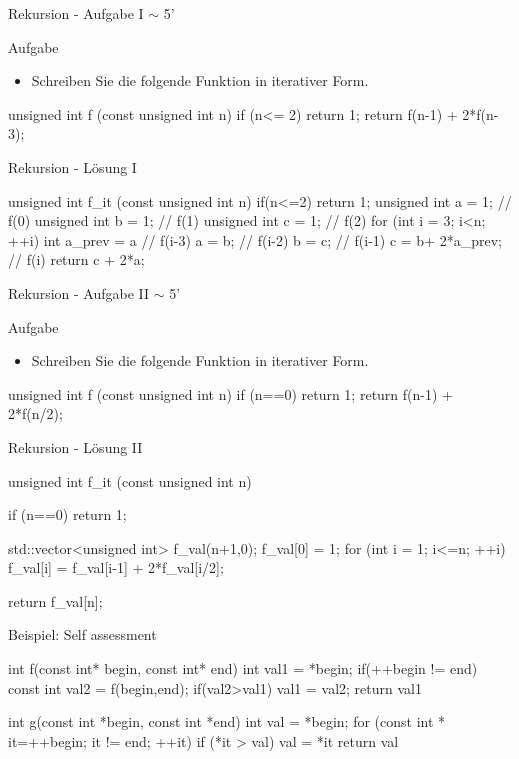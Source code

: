 \ifnum\conditionmacro=1 \documentclass[handout,usenames,dvipsnames]{beamer}\fi
\begin{document}
\begin{frame}[fragile]{Rekursion - Aufgabe I $\sim$ 5'}
\begin{block}{Aufgabe}
\begin{itemize}
\item Schreiben Sie die folgende Funktion in iterativer Form.
\end{itemize}
\end{block}
\begin{TPCpp}
unsigned int f (const unsigned int n)
{
	if (n<= 2) return 1;
	return f(n-1) + 2*f(n-3);
}
\end{TPCpp}
\end{frame}

\begin{frame}[fragile]{Rekursion - Lösung I}
\begin{TFCpp}
unsigned int f_it (const unsigned int n) {
	if(n<=2) return 1;
	unsigned int a = 1; // f(0)
	unsigned int b = 1; // f(1)
	unsigned int c = 1; // f(2)
	for (int i = 3; i<n; ++i){
		int a_prev = a    // f(i-3)
		a = b;            // f(i-2)
		b = c;            // f(i-1)
		c = b+ 2*a_prev;  // f(i)
	}
	return c + 2*a;
}
\end{TFCpp}
\end{frame}

\begin{frame}[fragile]{Rekursion - Aufgabe II $\sim$ 5'}
\begin{block}{Aufgabe}
\begin{itemize}
\item Schreiben Sie die folgende Funktion in iterativer Form.
\end{itemize}
\end{block}
\begin{TPCpp}
unsigned int f (const unsigned int n)
{
	if (n==0) return 1;
	return f(n-1) + 2*f(n/2);
}
\end{TPCpp}
\end{frame}

\begin{frame}[fragile]{Rekursion - Lösung II}
\begin{TFCpp}
unsigned int f_it (const unsigned int n)
{
	if (n==0) return 1;
	
	std::vector<unsigned int> f_val(n+1,0);
	f_val[0] = 1;
	for (int i = 1; i<=n; ++i)
		f_val[i] = f_val[i-1] + 2*f_val[i/2];
	
	return f_val[n];
}
\end{TFCpp}
\end{frame}

\begin{frame}[fragile]{Beispiel: Self assessment}
\begin{TFCpp}
int f(const int* begin, const int* end){
	int val1 = *begin;
	if(++begin != end){
		const int val2 = f(begin,end);
		if(val2>val1) { val1 = val2;}
	}
	return val1}

int g(const int *begin, const int *end){
	int val = *begin;
	for (const int * it=++begin; it != end; ++it){
		if (*it > val){ val = *it}
	}
	return val
}
\end{TFCpp}
\end{frame}
\end{document}
